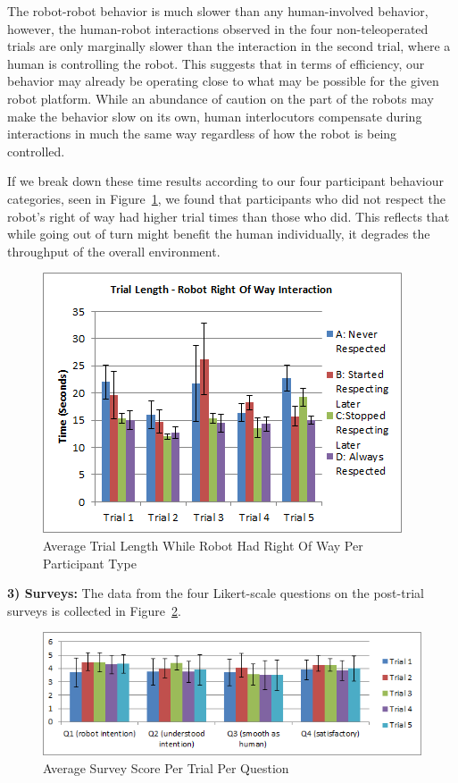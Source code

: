 \documentclass[letterpaper, 10 pt, conference]{ieeeconf}  %
\begin{document}
The robot-robot behavior is much slower than any human-involved behavior, however, the human-robot interactions observed in the four non-teleoperated trials are only marginally slower than the interaction in the second trial, where a human is controlling the robot. This suggests that in terms of efficiency, our behavior may already be operating close to what may be possible for the given robot platform. While an abundance of caution on the part of the robots may make the behavior slow on its own, human interlocutors compensate during interactions in much the same way regardless of how the robot is being controlled. 

If we break down these time results according to our four participant behaviour categories, seen in Figure~\ref{fig:Respect}, we found that participants who did not respect the robot's right of way had higher trial times than those who did. This reflects that while going out of turn might benefit the human individually, it degrades the throughput of the overall environment. 

     \begin{figure}
      \centering
      \includegraphics{Robot_right.png}
      \caption{Average Trial Length While Robot Had Right Of Way Per Participant Type}
      \label{fig:Respect}
   \end{figure}

\textbf{3) Surveys:} The data from the four Likert-scale questions on the post-trial surveys is collected in Figure~\ref{fig:Questionnaire}. 
 
     \begin{figure}
      \centering
      \includegraphics[width=\textwidth]{Questionnaire.png}
      \caption{Average Survey Score Per Trial Per Question }
      \label{fig:Questionnaire}
   \end{figure}
 
\end{document}
